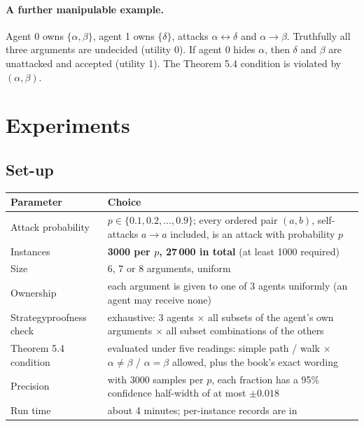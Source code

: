 \documentclass[11pt,a4paper]{article}
\newcommand{\code}[1]{\texttt{\detokenize{#1}}}
\begin{document}
\paragraph{A further manipulable example.} Agent 0 owns $\{\alpha,\beta\}$, agent 1 owns $\{\delta\}$, attacks
$\alpha\leftrightarrow\delta$ and $\alpha\to\beta$. Truthfully all three arguments are undecided (utility 0). If agent 0 hides
$\alpha$, then $\delta$ and $\beta$ are unattacked and accepted (utility 1). The Theorem 5.4 condition is violated by
$(\alpha,\beta)$.

\section{Experiments}

\subsection{Set-up}

\begin{center}
\small
\begin{tabularx}{\textwidth}{@{}lX@{}}
\toprule
Parameter & Choice\\
\midrule
Attack probability & $p\in\{0.1,0.2,\dots,0.9\}$; every ordered pair $(a,b)$, self-attacks $a\to a$ included, is an attack with probability $p$\\
Instances & \textbf{3000 per $p$, 27\,000 in total} (at least 1000 required)\\
Size & 6, 7 or 8 arguments, uniform\\
Ownership & each argument is given to one of 3 agents uniformly (an agent may receive none)\\
Strategyproofness check & exhaustive: 3 agents $\times$ all subsets of the agent's own arguments $\times$ all subset combinations of the others\\
Theorem 5.4 condition & evaluated under five readings: simple path / walk $\times$ $\alpha\ne\beta$ / $\alpha=\beta$ allowed, plus the book's exact wording\\
Precision & with 3000 samples per $p$, each fraction has a 95\% confidence half-width of at most $\pm0.018$\\
Run time & about 4 minutes; per-instance records are in \code{results/instances.csv}\\
\bottomrule
\end{tabularx}
\end{center}
\end{document}
